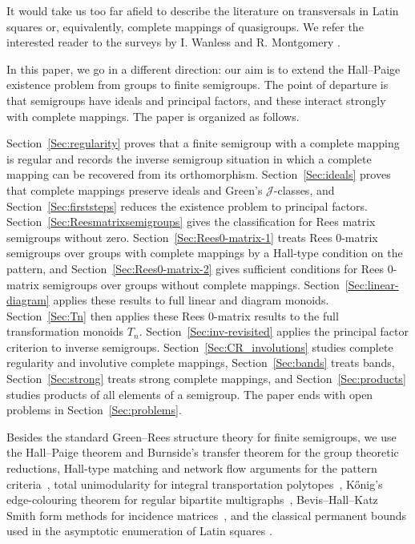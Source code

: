 \documentclass[11pt]{article}
\theoremstyle{plain}
\theoremstyle{remark}
\theoremstyle{definition}
\theoremstyle{plain}
\newcommand\gj{\mathcal{J}}
\begin{document}
It would take us too far afield to describe the literature on transversals in Latin squares or, equivalently, complete mappings of quasigroups. We refer the interested reader to the surveys by I. Wanless \cite{Wanless} and R. Montgomery \cite{Montgomery}.

In this paper, we go in a different direction: our aim is to extend the Hall--Paige
existence problem from groups to finite semigroups. The point of departure is that
semigroups have ideals and principal factors, and these interact strongly with complete
mappings. The paper is organized as follows.

Section~\ref{Sec:regularity} proves that a finite semigroup with a complete mapping is
regular and records the inverse semigroup situation in which a complete mapping can be
recovered from its orthomorphism. Section~\ref{Sec:ideals} proves that complete mappings
preserve ideals and Green's $\gj$-classes, and Section~\ref{Sec:firststeps} reduces the
existence problem to principal factors. Section~\ref{Sec:Reesmatrixsemigroups} gives the
classification for Rees matrix semigroups without zero. Section~\ref{Sec:Rees0-matrix-1}
treats Rees $0$-matrix semigroups over groups with complete mappings by a Hall-type
condition on the pattern, and Section~\ref{Sec:Rees0-matrix-2} gives sufficient
conditions for Rees $0$-matrix semigroups over groups without complete mappings.
Section~\ref{Sec:linear-diagram} applies these results to full linear and diagram monoids.
Section~\ref{Sec:Tn} then applies these Rees $0$-matrix results to the full
transformation monoids $T_n$.
Section~\ref{Sec:inv-revisited} applies the principal factor
criterion to inverse semigroups. Section~\ref{Sec:CR_involutions} studies complete
regularity and involutive complete mappings, Section~\ref{Sec:bands} treats bands,
Section~\ref{Sec:strong} treats strong complete mappings, and Section~\ref{Sec:products}
studies products of all elements of a semigroup. The paper ends with open problems in
Section~\ref{Sec:problems}.

Besides the standard Green--Rees structure theory for finite semigroups, we use the
Hall--Paige theorem and Burnside's transfer theorem for the group theoretic reductions,
Hall-type matching and network flow arguments for the pattern
criteria~\cite{Hall,Gale,Edmonds}, total unimodularity for integral
transportation polytopes~\cite{HoffmanKruskal,Schrijver},
K\H{o}nig's edge-colouring theorem for regular bipartite multigraphs~\cite{Konig},
Bevis--Hall--Katz Smith form methods for incidence matrices~\cite{BevisHallKatz}, and the classical
permanent bounds used in the asymptotic enumeration of Latin squares
\cite{Bregman,Egorychev,Falikman}.
\end{document}
